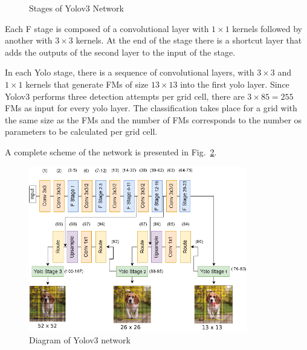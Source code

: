 \begin{figure}[!htb]
	\begin{subfigmatrix}{2}
	\end{subfigmatrix}
	\caption{Stages of Yolov3 Network}
	\label{fig:yolov3_stages}
\end{figure}

Each F stage is composed of a convolutional layer with $1\times1$ kernels followed by
another with $3\times3$  kernels. At the end of the stage there is a shortcut layer
that adds the outputs of the second layer to the input of the stage.

In each Yolo stage, there is a sequence of convolutional layers, with $3\times
3$ and $1\times 1$ kernels that generate FMs of size $13 \times 13$ into the
first yolo layer. Since Yolov3 performs three detection attempts per grid cell,
there are $3\times 85 = 255$ FMs as input for every yolo layer. The
classification takes place for a grid with the same size as the FMs and the
number of FMs corresponds to the number os parameters to be calculated per grid
cell.

A complete scheme of the network is presented in Fig.~\ref{fig:Yolov3_complete}.

\begin{figure}[!htb]
	\centering
	\includegraphics[width=0.85\textwidth]{Figures/CompleteYolov3Diagram.png}
	\caption[Caption for figure in TOC.]{Diagram of Yolov3 network}
	\label{fig:Yolov3_complete}
\end{figure}

